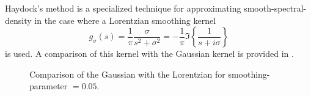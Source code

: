 Haydock's method \cite{haydock1972electronic,lin2016review} is a specialized technique for approximating \gls{smooth-spectral-density}
in the case where a Lorentzian smoothing kernel
\begin{equation}
    g_{\sigma}(s) = \frac{1}{\pi} \frac{\sigma}{s^2 + \sigma^2} = -\frac{1}{\pi} \Im\left\{ \frac{1}{s + i\sigma} \right\}
    \label{equ:5-experiments-cauchy-kernel}
\end{equation}
is used. A comparison of this kernel with the Gaussian kernel 
is provided in .\\
\begin{figure}[ht]
    \centering
    
    \caption{Comparison of the Gaussian with the Lorentzian 
        for \gls{smoothing-parameter} $=0.05$.}
    \label{fig:5-experiments-haydock-kernel}
\end{figure}

